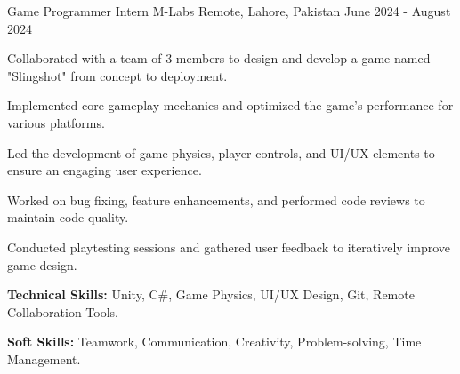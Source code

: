 \begin{cventries}
{\begin{cvitems}
      \end{cvitems}
    }
    \cventry
    {Game Programmer Intern} %
    {M-Labs} %
    {Remote, Lahore, Pakistan} %
    {June 2024 - August 2024} %
    {
      \begin{cvitems} %
        \item {Collaborated with a team of 3 members to design and develop a game named "Slingshot" from concept to deployment.}
        \item {Implemented core gameplay mechanics and optimized the game's performance for various platforms.}
        \item {Led the development of game physics, player controls, and UI/UX elements to ensure an engaging user experience.}
        \item {Worked on bug fixing, feature enhancements, and performed code reviews to maintain code quality.}
        \item {Conducted playtesting sessions and gathered user feedback to iteratively improve game design.}
        \item {\textbf{Technical Skills:} Unity, C#, Game Physics, UI/UX Design, Git, Remote Collaboration Tools.}
        \item {\textbf{Soft Skills:} Teamwork, Communication, Creativity, Problem-solving, Time Management.}
      \end{cvitems}
    }

\end{cventries}
